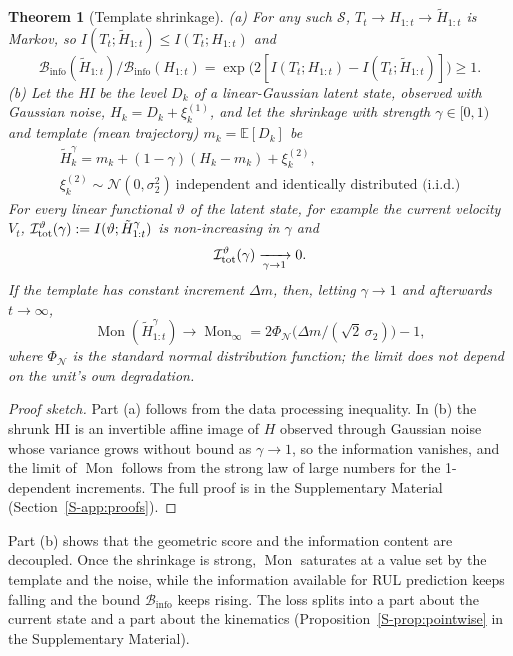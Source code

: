 \documentclass[preprint,12pt]{elsarticle}
\newtheorem{theorem}{Theorem}
\theoremstyle{definition}
\newcommand{\E}{\mathbb{E}}
\newcommand{\Binfo}{\mathcal{B}_{\mathrm{info}}}
\DeclareMathOperator{\Mon}{Mon}
\begin{document}
\begin{theorem}[Template shrinkage]
\label{thm:paradox}
(a) For any such $\mathcal S$, $T_t\to H_{1:t}\to\tilde H_{1:t}$ is Markov, so $I(T_t;\tilde H_{1:t})\le I(T_t;H_{1:t})$ and
\begin{equation}
\Binfo(\tilde H_{1:t})/\Binfo(H_{1:t})=\exp\!\big(2[I(T_t;H_{1:t})-I(T_t;\tilde H_{1:t})]\big)\ge 1 .
\end{equation}
(b) Let the HI be the level $D_k$ of a linear-Gaussian latent state, observed with Gaussian noise, $H_k=D_k+\xi^{(1)}_k$, and let the shrinkage with strength $\gamma\in[0,1)$ and template (mean trajectory) $m_k=\E[D_k]$ be
\begin{equation}
\begin{gathered}\tilde H_k^{\gamma}=m_k+(1-\gamma)(H_k-m_k)+\xi^{(2)}_k,\\ \xi^{(2)}_k\sim\mathcal N(0,\sigma_2^2)\ \text{independent and identically distributed (i.i.d.)}\end{gathered}
\end{equation}
For every linear functional $\vartheta$ of the latent state, for example the current velocity $V_t$, $\mathcal I^\vartheta_{\rm tot}(\gamma):=I(\vartheta;\tilde H^\gamma_{1:t})$ is non-increasing in $\gamma$ and
\begin{equation}
\mathcal I^\vartheta_{\rm tot}(\gamma)\xrightarrow[\gamma\to1]{}0.
\end{equation}
If the template has constant increment $\Delta m$, then, letting $\gamma\to 1$ and afterwards $t\to\infty$,
\begin{equation}
\Mon(\tilde H^{\gamma}_{1:t})\to \Mon_\infty=2\Phi_{\mathcal N}\!\big(\Delta m/(\sqrt2\,\sigma_2)\big)-1,
\end{equation}
where $\Phi_{\mathcal N}$ is the standard normal distribution function; the limit does not depend on the unit's own degradation.
\end{theorem}
\begin{proof}[Proof sketch]
Part (a) follows from the data processing inequality. In (b) the shrunk HI is an invertible affine image of $H$ observed through Gaussian noise whose variance grows without bound as $\gamma\to1$, so the information vanishes, and the limit of $\Mon$ follows from the strong law of large numbers for the 1-dependent increments. The full proof is in the Supplementary Material (Section~\ref{S-app:proofs}).
\end{proof}
Part (b) shows that the geometric score and the information content are decoupled. Once the shrinkage is strong, $\Mon$ saturates at a value set by the template and the noise, while the information available for RUL prediction keeps falling and the bound $\Binfo$ keeps rising. The loss splits into a part about the current state and a part about the kinematics (Proposition~\ref{S-prop:pointwise} in the Supplementary Material).
\end{document}
